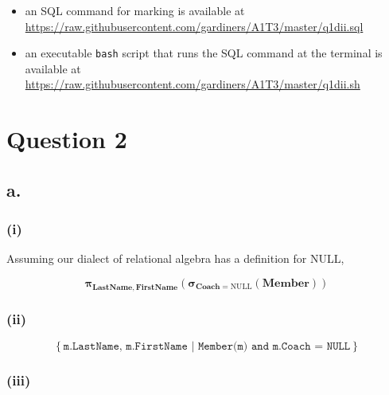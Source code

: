 \documentclass{article}
\newcommand{\select}[1]{
\boldsymbol{\sigma}_{#1}
}
\newcommand{\project}[1]{
\boldsymbol{\pi}_{#1}
}
\begin{document}
\begin{itemize}
    \item an SQL command for marking is available at \url{https://raw.githubusercontent.com/gardiners/A1T3/master/q1dii.sql}
    \item an executable \texttt{bash} script that runs the SQL command at the terminal is available at \url{https://raw.githubusercontent.com/gardiners/A1T3/master/q1dii.sh}
\end{itemize}

\section{Question 2}

\subsection{a.}

\subsubsection{(i)}

Assuming our dialect of relational algebra has a definition for NULL,

$$
\project{\mathbf{LastName, FirstName}}
\left(
\select{\mathbf{Coach} = \text{NULL}}\left(\mathbf{Member}\right)
\right)
$$

\subsubsection{(ii)}

$$
\left\{
\texttt{m.LastName, m.FirstName | Member(m) and m.Coach = NULL}
\right\}
$$

\subsubsection{(iii)}
\end{document}
